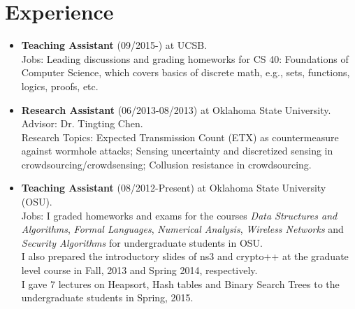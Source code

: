\documentclass{article}
\begin{document}
\section{{Experience}}
\begin{itemize}
\item {\bf Teaching Assistant} (09/2015-) at UCSB.\\
Jobs: Leading discussions and grading homeworks for CS 40: Foundations of Computer Science, which covers basics of discrete math, e.g., sets, functions, logics, proofs, etc.
\item {\bf Research Assistant} (06/2013-08/2013) at Oklahoma State University.\\
Advisor: Dr. Tingting Chen.\\
Research Topics: Expected Transmission Count (ETX) as countermeasure against wormhole attacks; Sensing uncertainty and discretized sensing in crowdsourcing/crowdsensing; Collusion resistance in crowdsourcing.
%
%
\item {\bf Teaching Assistant} (08/2012-Present) at Oklahoma State University (OSU).\\
Jobs: I graded homeworks and exams for the courses {\it Data Structures and Algorithms}, {\it Formal Languages}, {\it Numerical Analysis}, {\it Wireless Networks} and {\it Security Algorithms} for undergraduate students in OSU. \\
I also prepared the introductory slides of ns3 and crypto++ at the graduate level course in Fall, 2013 and Spring 2014, respectively.\\
I gave 7 lectures on Heapsort, Hash tables and Binary Search Trees to the undergraduate students in Spring, 2015.


\end{itemize}
\end{document}
